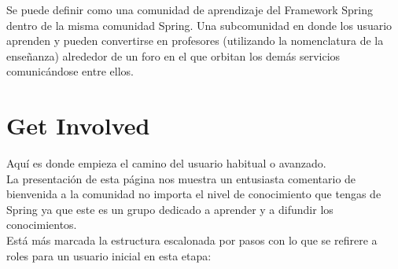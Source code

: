 \documentclass[11pt]{scrartcl}
\begin{document}
Se puede definir como una comunidad de aprendizaje del Framework Spring dentro de la misma comunidad Spring. Una subcomunidad en donde los usuario aprenden y pueden convertirse en profesores (utilizando la nomenclatura de la ense\~nanza) alrededor de un foro en el que orbitan los dem\'as servicios comunic\'andose entre ellos.

\section{Get Involved}

Aqu\'i es donde empieza el camino del usuario habitual o avanzado.\\

La presentaci\'on de esta p\'agina nos muestra un entusiasta comentario de bienvenida a la comunidad no importa el nivel de conocimiento que tengas de Spring ya que este es un grupo dedicado a aprender y a difundir los conocimientos.\\

Est\'a m\'as marcada la estructura escalonada por pasos con lo que se refirere a roles para un usuario inicial en esta etapa:
\end{document}
